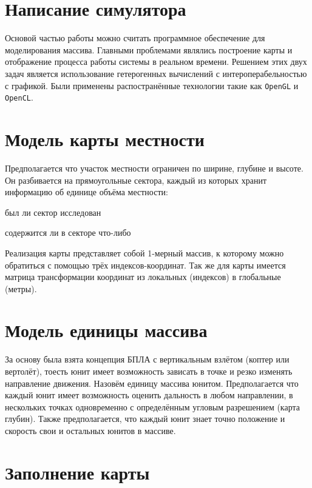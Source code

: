 \newpage
\section{Написание симулятора}

Основой частью работы можно считать программное обеспечение для моделирования
массива. Главными проблемами являлись построение карты и отображение процесса работы системы
в реальном времени. Решением этих двух задач является использование гетерогенных 
вычислений с интероперабельностью с графикой. Были применены распостранённые 
технологии такие как \verb|OpenGL| и \verb|OpenCL|.

\section{Модель карты местности}

Предполагается что участок местности ограничен по ширине, глубине и высоте.
Он разбивается на прямоугольные сектора, каждый из которых хранит информацию об единице объёма местности:
\begin{mintemize}
    \item был ли сектор исследован
    \item содержится ли в секторе что-либо
\end{mintemize}

Реализация карты представляет собой 1-мерный массив, к которому можно обратиться с помощью трёх
индексов-координат. Так же для карты имеется матрица трансформации координат из локальных (индексов)
в глобальные (метры).

\section{Модель единицы массива}

За основу была взята концепция БПЛА с вертикальным взлётом
(коптер или вертолёт), тоесть юнит имеет возможность зависать в точке и резко изменять направление движения.
Назовём единицу массива юнитом. Предполагается что каждый юнит имеет возможность
оценить дальность в любом направлении, в нескольких точках одновременно с определённым 
угловым разрешением (карта глубин). Также предполагается, что каждый юнит знает точно положение и скорость
свои и остальных юнитов в массиве.

\section{Заполнение карты}


